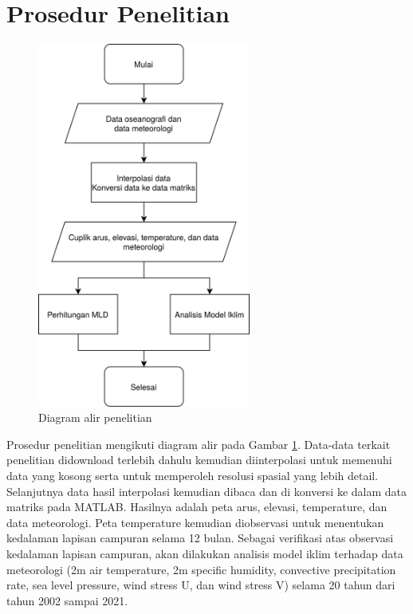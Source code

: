 \vspace{-0.5pc}
\section[Prosedur Penelitian]{Prosedur Penelitian}
\begin{spacing}{1.5}
	\begin{figure}[H]
		\centering
		\includegraphics[width=7cm]{contents/flowchart.png}
		\caption{Diagram alir penelitian}
		\label{fig:flowchart}
	\end{figure}
	Prosedur penelitian mengikuti diagram alir pada Gambar \ref{fig:flowchart}. Data-data terkait penelitian didownload terlebih dahulu kemudian diinterpolasi untuk memenuhi data yang kosong serta untuk memperoleh resolusi spasial yang lebih detail. Selanjutnya data hasil interpolasi kemudian dibaca dan di konversi ke dalam data matriks pada MATLAB. Hasilnya adalah peta arus, elevasi, temperature, dan data meteorologi. Peta temperature kemudian diobservasi untuk menentukan kedalaman lapisan campuran selama 12 bulan. Sebagai verifikasi atas observasi kedalaman lapisan campuran, akan dilakukan analisis model iklim terhadap data meteorologi (2m air temperature, 2m specific humidity, convective precipitation rate, sea level pressure, wind stress U, dan wind stress V) selama 20 tahun dari tahun 2002 sampai 2021.
\end{spacing}